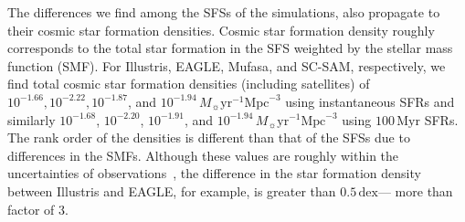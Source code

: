 \documentclass[tighten, preprint]{aastex62}
\newcommand{\todo}[1]{{\bf \textcolor{red}{ #1}}}
\begin{document}
The differences we find among the SFSs of the simulations, also propagate to their 
cosmic star formation densities. Cosmic star formation density roughly corresponds to the total 
star formation in the SFS weighted by the stellar mass function (SMF). For Illustris,
EAGLE, {\sc Mufasa}, and SC-SAM, respectively, we find total cosmic star formation 
densities (including satellites) of 
$10^{-1.66}, 10^{-2.22}, 10^{-1.87}$, and $10^{-1.94}\,M_\sun \mathrm{yr}^{-1} \mathrm{Mpc}^{-3}$ 
using instantaneous SFRs and similarly 
$10^{-1.68}$, $10^{-2.20}$, $10^{-1.91}$, and $10^{-1.94}\,M_\sun \mathrm{yr}^{-1} \mathrm{Mpc}^{-3}$
using $100\,\mathrm{Myr}$ SFRs. The rank order of the densities is different than that of the
SFSs due to differences in the SMFs. Although these values are 
roughly within the uncertainties of observations~\citep{madau2014}, 
the difference in the star formation density between Illustris and 
EAGLE, for example, is greater than $0.5\,\mathrm{dex}$--- more 
than factor of 3.

\end{document}
